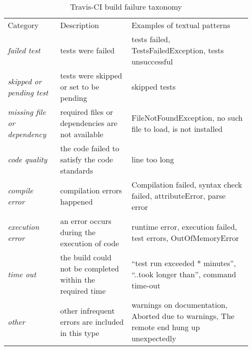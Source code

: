 
\begin{table}[t] \centering
\small
  \caption{Travis-CI build failure taxonomy
  \vspace{-0.2cm}
  }
  \label{error_types}

\begin{tabular}{ p{1.5cm}  p{2.5cm}  p{4cm} }
	
\hline 
\\[-1.8ex]\hline
Category & Description & Examples of textual patterns \\ \hline 
\emph{failed test} & tests were failed & tests failed, TestsFailedException, tests unsuccessful\\ \hline
\emph{skipped or pending test} & tests were skipped or set to be pending & skipped tests \\ \hline
\emph{missing file or dependency} & required files or dependencies are not available &  FileNotFoundException, no such file to load, is not installed \\ \hline
\emph{code quality} & the code failed to satisfy the code standards & line too long\\ \hline
\emph{compile error} &compilation errors happened & Compilation failed, syntax check failed, attributeError, parse error\\ \hline
\emph{execution error} &an error occurs during the execution of code & runtime error, execution failed, test errors, OutOfMemoryError\\ \hline
\emph{time out} & the build could not be completed within the required time& ``test run exceeded * minutes'', ``..took longer than'', command time-out \\ \hline 
\emph{other} &other infrequent errors are included in this type & warnings on documentation, Aborted due to warnings, The remote end hung up unexpectedly \\
\hline

\end{tabular}

\end{table}

